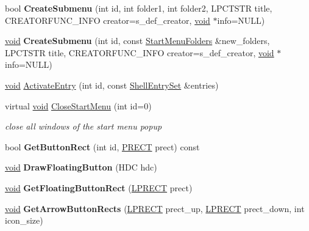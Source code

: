 \begin{DoxyCompactItemize}
bool {\bfseries Create\+Submenu} (int id, int folder1, int folder2, L\+P\+C\+T\+S\+TR title, C\+R\+E\+A\+T\+O\+R\+F\+U\+N\+C\+\_\+\+I\+N\+FO creator=s\+\_\+def\+\_\+creator, \hyperlink{interfacevoid}{void} $\ast$info=N\+U\+LL)
\item 
\mbox{\label{struct_start_menu_aa3506a7441ba3f31e220d5c89e8bc96c}} 
\hyperlink{interfacevoid}{void} {\bfseries Create\+Submenu} (int id, const \hyperlink{classlist}{Start\+Menu\+Folders} \&new\+\_\+folders, L\+P\+C\+T\+S\+TR title, C\+R\+E\+A\+T\+O\+R\+F\+U\+N\+C\+\_\+\+I\+N\+FO creator=s\+\_\+def\+\_\+creator, \hyperlink{interfacevoid}{void} $\ast$info=N\+U\+LL)
\item 
\hyperlink{interfacevoid}{void} \hyperlink{struct_start_menu_ac72c647cac3307a5f0b80e19ed5c155a}{Activate\+Entry} (int id, const \hyperlink{classset}{Shell\+Entry\+Set} \&entries)
\item 
\mbox{\label{struct_start_menu_a5415ca11743817f68e853c72efa39604}} 
virtual \hyperlink{interfacevoid}{void} \hyperlink{struct_start_menu_a5415ca11743817f68e853c72efa39604}{Close\+Start\+Menu} (int id=0)
\begin{DoxyCompactList}\small\item\em close all windows of the start menu popup \end{DoxyCompactList}\item 
\mbox{\label{struct_start_menu_a4a9e20c5ae05d69f06478fedba9b01c2}} 
bool {\bfseries Get\+Button\+Rect} (int id, \hyperlink{structtag_r_e_c_t}{P\+R\+E\+CT} prect) const
\item 
\mbox{\label{struct_start_menu_ab89551189015d47181093fa9f939db12}} 
\hyperlink{interfacevoid}{void} {\bfseries Draw\+Floating\+Button} (H\+DC hdc)
\item 
\mbox{\label{struct_start_menu_ab09a726b63f97d7702f9a6e0db56d6a3}} 
\hyperlink{interfacevoid}{void} {\bfseries Get\+Floating\+Button\+Rect} (\hyperlink{structtag_r_e_c_t}{L\+P\+R\+E\+CT} prect)
\item 
\mbox{\label{struct_start_menu_aa4c40d6a5f19484219c3d04c30c6e4ff}} 
\hyperlink{interfacevoid}{void} {\bfseries Get\+Arrow\+Button\+Rects} (\hyperlink{structtag_r_e_c_t}{L\+P\+R\+E\+CT} prect\+\_\+up, \hyperlink{structtag_r_e_c_t}{L\+P\+R\+E\+CT} prect\+\_\+down, int icon\+\_\+size)

\end{DoxyCompactItemize}
